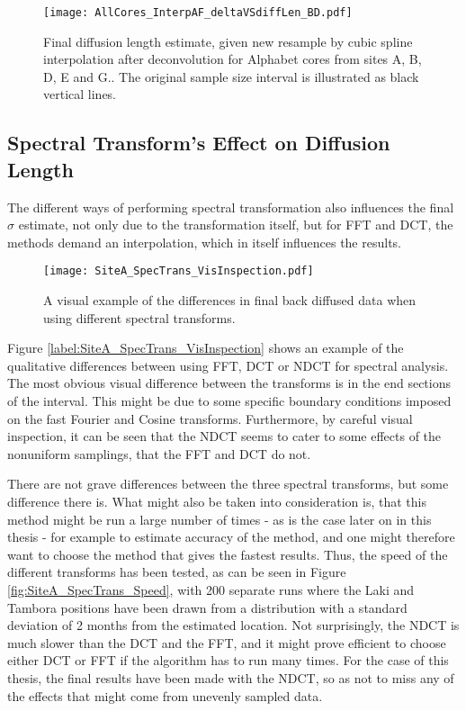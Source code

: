 \documentclass[../../CompleteThesis2/Complete_2ndDraft]{subfiles}
\begin{document}
\begin{figure}[!htb]
	\centering
	\texttt{[image: AllCores\_InterpAF\_deltaVSdiffLen\_BD.pdf]}
	\caption[Diffusion length versus resampling size after deconvolution, all cores.]{\small Final diffusion length estimate, given new resample by cubic spline interpolation after deconvolution for Alphabet cores from sites A, B, D, E and G.. The original sample size interval is illustrated as black vertical lines.}
	\label{Fig:COMPMETH_AllCores_SamplingVsDiffLen}\textit{}
\end{figure}


\subsection[Spectral Transforms]{Spectral Transform's Effect on Diffusion Length}
\label{Subsec:Method_TestStab_SpecTrans}
The different ways of performing spectral transformation also influences the final $\sigma$ estimate, not only due to the transformation itself, but for FFT and DCT, the methods demand an interpolation, which in itself influences the results. 

\begin{figure}[!htb]
	\centering
	\texttt{[image: SiteA\_SpecTrans\_VisInspection.pdf]}
	\caption[Qualitative Example of Spectral Transform's Effect on $\sigma$]{\small A visual example of the differences in final back diffused data when using different spectral transforms. }
	\label{fig:SiteA_SpecTrans_VisInspection}
\end{figure}

Figure \ref{label:SiteA_SpecTrans_VisInspection} shows an example of the qualitative differences between using FFT, DCT or NDCT for spectral analysis. The most obvious visual difference between the transforms is in the end sections of the interval. This might be due to some specific boundary conditions imposed on the fast Fourier and Cosine transforms. Furthermore, by careful visual inspection, it can be seen that the NDCT seems to cater to some effects of the nonuniform samplings, that the FFT and DCT do not.

There are not grave differences between the three spectral transforms, but some difference there is. What might also be taken into consideration is, that this method might be run a large number of times - as is the case later on in this thesis - for example to estimate accuracy of the method, and one might therefore want to choose the method that gives the fastest results. Thus, the speed of the different transforms has been tested, as can be seen in Figure \ref{fig:SiteA_SpecTrans_Speed}, with 200 separate runs where the Laki and Tambora positions have been drawn from a distribution with a standard deviation of 2 months from the estimated location. Not surprisingly, the NDCT is much slower than the DCT and the FFT, and it might prove efficient to choose either DCT or FFT if the algorithm has to run many times. For the case of this thesis, the final results have been made with the NDCT, so as not to miss any of the effects that might come from unevenly sampled data.
\end{document}

